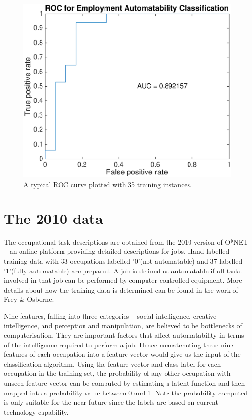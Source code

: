\documentclass[11pt]{report}
\numberwithin{equation}{chapter}
\begin{document}
\begin{spacing}{2}
\begin{figure}[!htb]
\centering
\includegraphics[scale=0.5]{ROC1.eps}
\caption{A typical ROC curve plotted with 35 training instances. }
\label{fig:ROC}
\end{figure}



\newpage
\section{The 2010 data}%
The occupational task descriptions are obtained from the 2010 version of O*NET -- an online platform providing detailed descriptions for jobs. Hand-labelled training data with 33 occupations labelled '0'(not automatable) and 37 labelled '1'(fully automatable) are prepared. A job is defined as automatable if all tasks involved in that job can be performed by computer-controlled equipment. More details about how the training data is determined can be found in the work of Frey \& Osborne\cite{frey2013future}.  

Nine features, falling into three categories -- social intelligence, creative intelligence, and perception and manipulation, are believed to be bottlenecks of computerisation. They  are important factors that affect automatability in terms of the intelligence required to perform a job. Hence concatenating these nine features of each occupation into a feature vector would give us the input of the classification algorithm. Using the feature vector and class label for each occupation in the training set, the probability of any other occupation with unseen feature vector can be computed by estimating a latent function and then mapped into a probability value between 0 and 1. Note the probability computed is only suitable for the near future since the labels are based on current technology capability.


\end{spacing}
\end{document}
